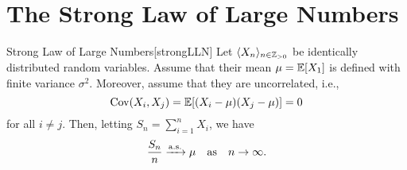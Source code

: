 \documentclass[../probability.tex]{subfiles}
\begin{document}
\section{The Strong Law of Large Numbers}

\begin{Theorem}{Strong Law of Large Numbers}[strongLLN]
    Let \(\lang X_n \rang_{n\in \ZZ_{>0}}\) be identically distributed random variables.
    Assume that their mean \(\mu = \mathbb{E}[X_1]\) is defined with
    finite variance \(\sigma^2\).
    Moreover, assume that they are uncorrelated, i.e.,
    \[
        \operatorname{Cov}(X_i, X_j) = \mathbb{E}[(X_i-\mu)(X_j-\mu)] = 0
    \]
    for all \(i \neq j\). Then, letting \(S_n = \sum_{i=1}^n X_i\),
    we have
    \[
        \frac{S_n}{n} \xrightarrow{\mathrm{a.s.}} \mu\quad\text{as}\quad n \to \infty\text.
    \]
\end{Theorem}
\end{document}
